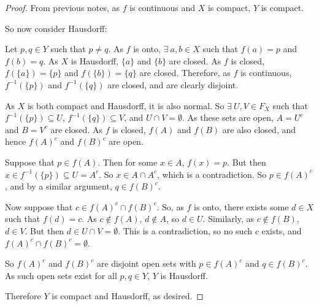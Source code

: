 \begin{proof}
	From previous notes, as $f$ is continuous and $X$ is compact, $Y$ is compact.
	
	So now consider Hausdorff:
	
	Let $p,q \in Y$ such that $p \neq q$. As $f$ is onto, $\exists \ a,b \in X$ such that $f(a) = p$ and $f(b) = q$. As $X$ is Hausdorff, $\{a\}$ and $\{b\}$ are closed. As $f$ is closed, $f(\{a\}) = \{p\}$ and $f(\{b\}) = \{q\}$ are closed. Therefore, as $f$ is continuous, $f^{-1}(\{p\})$ and $f^{-1}(\{q\})$ are closed, and are clearly disjoint.
	
	As $X$ is both compact and Hausdorff, it is also normal. So $\exists \ U,V \in F_X$ such that $f^{-1}(\{p\}) \subseteq U$, $f^{-1}(\{q\}) \subseteq V$, and $U \cap V = \emptyset$. As these sets are open, $A = U^c$ and $B = V^c$ are closed. As $f$ is closed, $f(A)$ and $f(B)$ are also closed, and hence $f(A)^c$ and $f(B)^c$ are open.
	
	Suppose that $p \in f(A)$. Then for some $x \in A$, $f(x) = p$. But then $x \in f^{-1}(\{p\}) \subseteq U = A^c$. So $x \in A \cap A^c$, which is a contradiction. So $p \in f(A)^c$, and by a similar argument, $q \in f(B)^c$.
	
	Now suppose that $c \in f(A)^c \cap f(B)^c$. So, as $f$ is onto, there exists some $d \in X$ such that $f(d) = c$. As $c \notin f(A)$, $d \notin A$, so $d \in U$. Similarly, as $c \notin f(B)$, $d \in V$. But then $d \in U \cap V = \emptyset$. This is a contradiction, so no such $c$ exists, and $f(A)^c \cap f(B)^c = \emptyset$.
	
	So $f(A)^c$ and $f(B)^c$ are disjoint open sets with $p \in f(A)^c$ and $q \in f(B)^c$. As such open sets exist for all $p,q \in Y$, $Y$ is Hausdorff.
	
	Therefore $Y$ is compact and Hausdorff, as desired. 
\end{proof}
